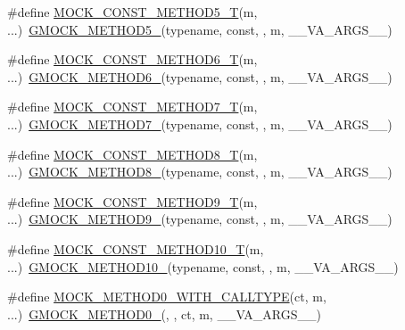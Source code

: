 \begin{DoxyCompactItemize}
\item 
\#define \hyperlink{gmock-generated-function-mockers_8h_a37d02091cf2e4d31c11f38609d12a815}{M\+O\+C\+K\+\_\+\+C\+O\+N\+S\+T\+\_\+\+M\+E\+T\+H\+O\+D5\+\_\+T}(m, ...)~\hyperlink{gmock-generated-function-mockers_8h_a9e3ecd392499ab19a4a6d3adcabf56f6}{G\+M\+O\+C\+K\+\_\+\+M\+E\+T\+H\+O\+D5\+\_\+}(typename, const, , m, \+\_\+\+\_\+\+V\+A\+\_\+\+A\+R\+G\+S\+\_\+\+\_\+)
\item 
\#define \hyperlink{gmock-generated-function-mockers_8h_a18f8d1d9ac6c6684bd681342e130662b}{M\+O\+C\+K\+\_\+\+C\+O\+N\+S\+T\+\_\+\+M\+E\+T\+H\+O\+D6\+\_\+T}(m, ...)~\hyperlink{gmock-generated-function-mockers_8h_ad0ca7f6973a076d0af4c953f8ed91842}{G\+M\+O\+C\+K\+\_\+\+M\+E\+T\+H\+O\+D6\+\_\+}(typename, const, , m, \+\_\+\+\_\+\+V\+A\+\_\+\+A\+R\+G\+S\+\_\+\+\_\+)
\item 
\#define \hyperlink{gmock-generated-function-mockers_8h_a6e9ae85c17b12ba8882e06b3785d4582}{M\+O\+C\+K\+\_\+\+C\+O\+N\+S\+T\+\_\+\+M\+E\+T\+H\+O\+D7\+\_\+T}(m, ...)~\hyperlink{gmock-generated-function-mockers_8h_ab98a8399ba62b53b375c2807f4d39d2f}{G\+M\+O\+C\+K\+\_\+\+M\+E\+T\+H\+O\+D7\+\_\+}(typename, const, , m, \+\_\+\+\_\+\+V\+A\+\_\+\+A\+R\+G\+S\+\_\+\+\_\+)
\item 
\#define \hyperlink{gmock-generated-function-mockers_8h_a430c2eae077074190d4b380868d42944}{M\+O\+C\+K\+\_\+\+C\+O\+N\+S\+T\+\_\+\+M\+E\+T\+H\+O\+D8\+\_\+T}(m, ...)~\hyperlink{gmock-generated-function-mockers_8h_aa84a36427c44505207b7cad5dec7ad67}{G\+M\+O\+C\+K\+\_\+\+M\+E\+T\+H\+O\+D8\+\_\+}(typename, const, , m, \+\_\+\+\_\+\+V\+A\+\_\+\+A\+R\+G\+S\+\_\+\+\_\+)
\item 
\#define \hyperlink{gmock-generated-function-mockers_8h_a7875d0d77516825a4b9cee703ae85c6f}{M\+O\+C\+K\+\_\+\+C\+O\+N\+S\+T\+\_\+\+M\+E\+T\+H\+O\+D9\+\_\+T}(m, ...)~\hyperlink{gmock-generated-function-mockers_8h_aa820171a19cc587c247dbe05cbffc55f}{G\+M\+O\+C\+K\+\_\+\+M\+E\+T\+H\+O\+D9\+\_\+}(typename, const, , m, \+\_\+\+\_\+\+V\+A\+\_\+\+A\+R\+G\+S\+\_\+\+\_\+)
\item 
\#define \hyperlink{gmock-generated-function-mockers_8h_aa31d758cb898bad2d16ac706c204da7f}{M\+O\+C\+K\+\_\+\+C\+O\+N\+S\+T\+\_\+\+M\+E\+T\+H\+O\+D10\+\_\+T}(m, ...)~\hyperlink{gmock-generated-function-mockers_8h_a81a48223a8771de36ef92ac6d56f6e81}{G\+M\+O\+C\+K\+\_\+\+M\+E\+T\+H\+O\+D10\+\_\+}(typename, const, , m, \+\_\+\+\_\+\+V\+A\+\_\+\+A\+R\+G\+S\+\_\+\+\_\+)
\item 
\#define \hyperlink{gmock-generated-function-mockers_8h_acedf2c97e3493f4f39d35bbead8d9e4a}{M\+O\+C\+K\+\_\+\+M\+E\+T\+H\+O\+D0\+\_\+\+W\+I\+T\+H\+\_\+\+C\+A\+L\+L\+T\+Y\+PE}(ct,  m, ...)~\hyperlink{gmock-generated-function-mockers_8h_ae0d290ffa58d7c624b2e3487ba1252f4}{G\+M\+O\+C\+K\+\_\+\+M\+E\+T\+H\+O\+D0\+\_\+}(, , ct, m, \+\_\+\+\_\+\+V\+A\+\_\+\+A\+R\+G\+S\+\_\+\+\_\+)

\end{DoxyCompactItemize}
